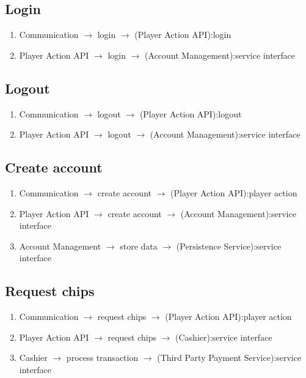 \documentclass[a4paper,11pt]{report}
\begin{document}
\subsection{Login}
\begin{enumerate}
\item Communication $\rightarrow$ login $\rightarrow$ (Player Action API):login
\item Player Action API $\rightarrow$ login $\rightarrow$ (Account Management):service interface
\end{enumerate}

\subsection{Logout}
\begin{enumerate}
\item Communication $\rightarrow$ logout $\rightarrow$ (Player Action API):logout
\item Player Action API $\rightarrow$ logout $\rightarrow$ (Account Management):service interface
\end{enumerate}

\subsection{Create account}
\begin{enumerate}
\item Communication $\rightarrow$ create account $\rightarrow$ (Player Action API):player action
\item Player Action API $\rightarrow$ create account $\rightarrow$ (Account Management):service interface
\item Account Management $\rightarrow$ store data $\rightarrow$ (Persistence Service):service interface
\end{enumerate}

\subsection{Request chips}
\begin{enumerate}
\item Communication $\rightarrow$ request chips $\rightarrow$ (Player Action API):player action
\item Player Action API $\rightarrow$ request chips $\rightarrow$ (Cashier):service interface
\item Cashier $\rightarrow$ process transaction $\rightarrow$ (Third Party Payment Service):service interface
\end{enumerate}
\end{document}
